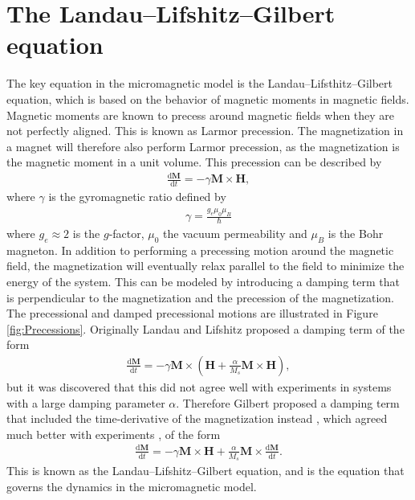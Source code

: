 \section{The Landau--Lifshitz--Gilbert equation}
The key equation in the micromagnetic model is the Landau--Lifsthitz--Gilbert equation, which is based on the behavior of magnetic moments in magnetic fields. Magnetic moments are known to precess around magnetic fields when they are not perfectly aligned. This is known as Larmor precession. The magnetization in a magnet will therefore also perform Larmor precession, as the magnetization is the magnetic moment in a unit volume. This precession can be described by
\begin{align}
\frac{\textrm{d}\mathbold{M}}{\textrm{d}t} = -\gamma\mathbold{M}\times\mathbold{H},
\end{align}
where $\gamma$ is the gyromagnetic ratio defined by
\begin{align}
\gamma = \frac{g_e\mu_0\mu_B}{\hbar}
\end{align}
where $g_e \approx 2$ is the $g$-factor, $\mu_0$ the vacuum permeability and $\mu_B$ is the Bohr magneton. In addition to performing a precessing motion around the magnetic field, the magnetization will eventually relax parallel to the field to minimize the energy of the system. This can be modeled by introducing a damping term that is perpendicular to the magnetization and the precession of the magnetization. The precessional and damped precessional motions are illustrated in Figure \ref{fig:Precessions}. Originally Landau and Lifshitz proposed \cite{LandauLifshitz1935} a damping term of the form
\begin{align}
\frac{\textrm{d}\mathbold{M}}{\textrm{d}t} = -\gamma\mathbold{M}\times(\mathbold{H}+\frac{\alpha}{M_s}\mathbold{M}\times\mathbold{H}),
\end{align}
but it was discovered that this did not agree well with experiments in systems with a large damping parameter $\alpha$. Therefore Gilbert proposed a damping term that included the time-derivative of the magnetization instead \cite{Gilbert2004Classics}, which agreed much better with experiments \cite{GilbertKelly1955}, of the form
\begin{align}
\label{eq:LLG}
\frac{\textrm{d}\mathbold{M}}{\textrm{d}t} = -\gamma\mathbold{M}\times\mathbold{H}+\frac{\alpha}{M_s}\mathbold{M}\times\frac{\textrm{d}\mathbold{M}}{\textrm{d}t}.
\end{align}
This is known as the Landau--Lifshitz--Gilbert equation, and is the equation that governs the dynamics in the micromagnetic model.
